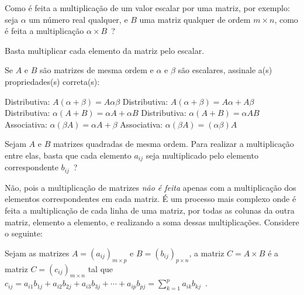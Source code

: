 \documentclass[pdftex, brazil, 12pt, oneside, addpoints]{exam}
\newcommand{\vf}[1][{}]{%
  \fillin[#1][0.25in]%
}
\begin{document}
\begin{questions}

\question
Como é feita a multiplicação de um valor escalar por uma matriz, por exemplo: seja $\alpha$ um
número real qualquer, e $B$ uma matriz qualquer de ordem $m \times n$, como é feita a multiplicação $\alpha \times B$\ ?
\begin{solutionorlines}[0.50in]
  Basta multiplicar cada elemento da matriz pelo escalar.
\end{solutionorlines}

\question
Se $A$ e $B$ são matrizes de mesma ordem e $\alpha$ e $\beta$ são escalares, assinale
a(s) propriedades(s) correta(s):
\begin{checkboxes}
  \choice Distributiva: $A(\alpha + \beta) = A \alpha \beta$
  \CorrectChoice Distributiva: $A(\alpha + \beta) = A \alpha + A \beta$
  \CorrectChoice Distributiva: $\alpha (A + B) = \alpha A + \alpha B$
  \choice Distributiva: $\alpha (A + B) = \alpha AB$
  \choice Associativa: $\alpha(\beta A) = \alpha A + \beta$
  \CorrectChoice Associativa: $\alpha(\beta A) = (\alpha \beta)A$
\end{checkboxes}

\question
Sejam $A$ e $B$ matrizes quadradas de mesma ordem. Para realizar a multiplicação entre elas,
basta que cada elemento $a_{ij}$ seja multiplicado pelo elemento correspondente $b_{ij}$\ ?
\begin{solutionorlines}[0.50in]
  Não, pois a multiplicação de matrizes \emph{não é feita} apenas com a multiplicação
  dos elementos correspondentes em cada matriz. É um processo mais complexo onde é feita a
  multiplicação de cada linha de uma matriz, por todas as colunas da outra matriz, elemento a
  elemento, e realizando a soma dessas multiplicações. Considere o seguinte:

  Sejam as matrizes $A = (a_{ij})_{m \times p}$ e $B = (b_{ij})_{p \times n}$, a matriz $C = A \times B$
  é a matriz $C = (c_{ij})_{m \times n}$ tal que $c_{ij} = a_{i1}b_{1j} + a_{i2}b_{2j} + a_{i3}b_{3j} + \cdots + a_{ip}b_{pj} = \sum_{k=1}^{p} a_{ik}b_{kj}$\ .


\end{solutionorlines}
\end{questions}
\end{document}
